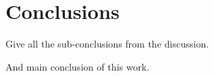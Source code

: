 \chapter{Conclusions}
\label{ch:conclusion}






Give all the sub-conclusions from the discussion.


And main conclusion of this work.






